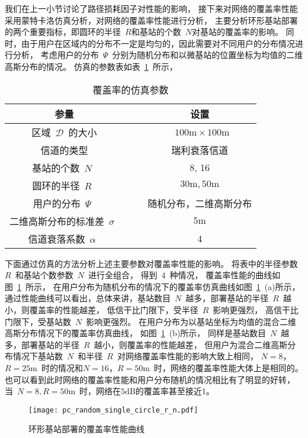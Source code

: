 我们在上一小节讨论了路径损耗因子对性能的影响，
接下来对网络的覆盖率性能采用蒙特卡洛仿真分析，对网络的覆盖率性能进行分析，
主要分析环形基站部署的两个重要指标，即圆环的半径~$R$和基站的个数~$N$对基站的覆盖率的影响。
同时，由于用户在区域内的分布不一定是均匀的，因此需要对不同用户的分布情况进行分析，
考虑用户的分布~$\Psi$~分别为随机分布和以微基站的位置坐标为均值的二维高斯分布的情况。
仿真的参数表如表~\ref{single_circle_pc_sim_para}~所示，
\begin{table}[htbp]
\caption{覆盖率的仿真参数}
\label{single_circle_pc_sim_para}
\vspace{0.5em}\centering\wuhao
\begin{tabular}{cccc}
\toprule[1.5pt]
参量 & & & 设置 \\
\midrule[0.5pt]
区域~$\mathcal{D}$~的大小  & & & ~$100\mathrm{m} \times 100 \mathrm{m}$ \\
信道的类型 & & &  瑞利衰落信道\\
基站的个数~$N$~ & & &  8, 16\\
圆环的半径~$R$~ & & &  ${30\mathrm{m}},{50\mathrm{m}}$\\
用户的分布~$\Psi$~ & & & 随机分布，二维高斯分布\\
二维高斯分布的标准差~$\sigma$~ & & & ${5\mathrm{m}}$\\
信道衰落系数~$\alpha$~  & & & 4\\
\bottomrule[1.5pt]
\end{tabular}
\end{table}
下面通过仿真的方法分析上述主要参数对覆盖率性能的影响。
将表中的半径参数~$R$~和基站个数参数~$N$~进行全组合，
得到~4~种情况，
覆盖率性能的曲线如图~\ref{pc_random_single_circle_r_n}~所示，
在用户分布为随机分布的情况下的覆盖率仿真曲线如图~\ref{pc_random_single_circle_r_n}~(a)所示，
通过性能曲线可以看出，总体来讲，基站数目~$N$~越多，部署基站的半径~$R$~越小，则覆盖率的性能越差，
低信干比门限下，受半径~$R$~影响更强烈，
高信干比门限下，受基站数~$N$~影响更强烈。
在用户分布为以基站坐标为均值的混合二维高斯分布情况下的覆盖率仿真曲线，
如图~\ref{pc_random_single_circle_r_n}~(b)所示，
同样是基站数目~$N$~越多，部署基站的半径~$R$~越小，则覆盖率的性能越差，
但用户为混合二维高斯分布情况下基站数~$N$~和半径~$R$~对网络覆盖率性能的影响大致上相同，
$N=8$，$R=25\mathrm{m}$~时的情况和$N=16$，$R=50\mathrm{m}$~时，网络的覆盖率性能大体上是相同的。
也可以看到此时网络的覆盖率性能和用户分布随机的情况相比有了明显的好转，
当~$N=8,R=50\mathrm{m}$~时，网络在$5\mathrm{dB}$的覆盖率甚至接近1。

\begin{figure}[htbp]
\centering
\texttt{[image: pc\_random\_single\_circle\_r\_n.pdf]}
\caption{环形基站部署的覆盖率性能曲线}\vspace{-0.5em}
\label{pc_random_single_circle_r_n}
\end{figure}


